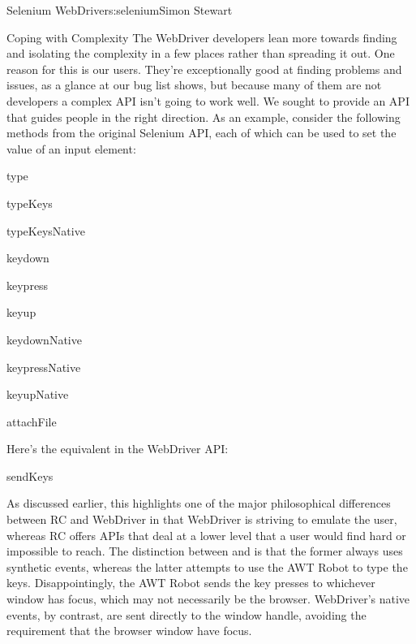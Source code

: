 \begin{aosachapter}{Selenium WebDriver}{s:selenium}{Simon Stewart}
\begin{aosasect1}{Coping with Complexity}
The WebDriver developers lean more towards finding and isolating the
complexity in a few places rather than spreading it out. One reason
for this is our users. They're exceptionally good at finding problems
and issues, as a glance at our bug list shows, but because many of
them are not developers a complex API isn't going to work well. We
sought to provide an API that guides people in the right direction. As
an example, consider the following methods from the original Selenium
API, each of which can be used to set the value of an input element:

\begin{aosaitemize}

\item type

\item typeKeys

\item typeKeysNative

\item keydown

\item keypress

\item keyup

\item keydownNative

\item keypressNative

\item keyupNative

\item attachFile

\end{aosaitemize}

Here's the equivalent in the WebDriver API:

\begin{aosaitemize}

\item sendKeys

\end{aosaitemize}

As discussed earlier, this highlights one of the major philosophical
differences between RC and WebDriver in that WebDriver is striving to
emulate the user, whereas RC offers APIs that deal at a lower level
that a user would find hard or impossible to reach. The distinction
between  and  is that the former
always uses synthetic events, whereas the latter attempts to use the
AWT Robot to type the keys. Disappointingly, the AWT Robot sends the
key presses to whichever window has focus, which may not necessarily
be the browser. WebDriver's native events, by contrast, are sent
directly to the window handle, avoiding the requirement that the
browser window have focus.


\end{aosasect1}
\end{aosachapter}
